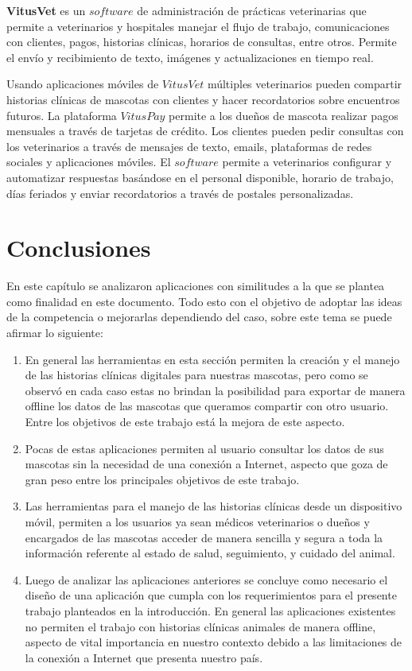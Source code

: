 \textbf{VitusVet}  es un $software$ de administración de prácticas veterinarias que permite a veterinarios y hospitales manejar el flujo de trabajo, comunicaciones con clientes, pagos, historias clínicas, horarios de consultas, entre otros. Permite el envío y recibimiento de texto, imágenes y actualizaciones en tiempo real.

Usando aplicaciones móviles de $VitusVet$ múltiples veterinarios pueden compartir historias clínicas de mascotas con clientes y hacer recordatorios sobre encuentros futuros. La plataforma $VitusPay$ permite a los dueños de mascota realizar pagos mensuales a través de tarjetas de crédito. Los clientes pueden pedir consultas con los veterinarios a través de mensajes de texto, emails, plataformas de redes sociales y aplicaciones móviles. El $software$ permite a veterinarios configurar y automatizar respuestas basándose en el personal disponible, horario de trabajo, días feriados y enviar recordatorios a través de postales personalizadas. 



\section{Conclusiones}\label{chapter:conclus}

En este capítulo se analizaron aplicaciones con similitudes a la que se plantea como finalidad en este documento. Todo esto con el objetivo de adoptar las ideas de la competencia o mejorarlas dependiendo del caso, sobre este tema se puede afirmar lo siguiente:
\begin{enumerate}
	\item	En general las herramientas en esta sección permiten la creación y el manejo de las historias clínicas digitales para nuestras mascotas, pero como se observó en cada caso estas no brindan la posibilidad para exportar de manera offline los datos de las mascotas que queramos compartir con otro usuario. Entre los objetivos de este trabajo está la mejora de este aspecto.
	\item	Pocas de estas aplicaciones permiten al usuario consultar los datos de sus mascotas sin la necesidad de una conexión a Internet, aspecto que goza de gran peso entre los principales objetivos de este trabajo.
	\item	Las herramientas para el manejo de las historias clínicas desde un dispositivo móvil, permiten a los usuarios ya sean médicos veterinarios o dueños y encargados de las mascotas acceder de manera sencilla y segura a toda la información referente al estado de salud, seguimiento, y cuidado del animal.
	\item	Luego de analizar las aplicaciones anteriores se concluye como necesario el diseño de una aplicación que cumpla con los requerimientos para el presente trabajo planteados en la introducción. En general las aplicaciones existentes no permiten el trabajo con historias clínicas animales de manera offline, aspecto de vital importancia en nuestro contexto debido a las limitaciones de la conexión a Internet que presenta nuestro país.
\end{enumerate}








